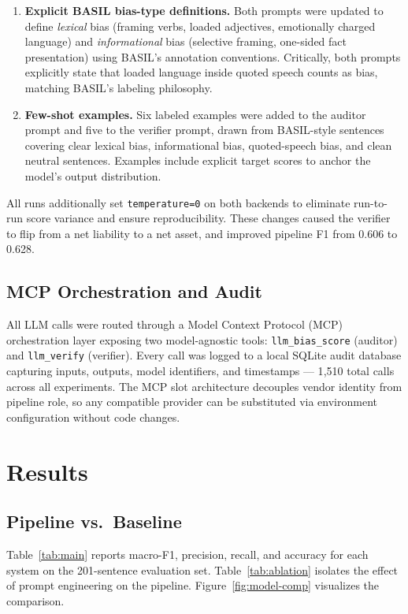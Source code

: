 \documentclass[11pt]{article}
\begin{document}
\begin{enumerate}
\itemsep2pt
\item \textbf{Explicit BASIL bias-type definitions.} Both prompts were updated to define \textit{lexical} bias (framing verbs, loaded adjectives, emotionally charged language) and \textit{informational} bias (selective framing, one-sided fact presentation) using BASIL's annotation conventions. Critically, both prompts explicitly state that loaded language inside quoted speech counts as bias, matching BASIL's labeling philosophy.
\item \textbf{Few-shot examples.} Six labeled examples were added to the auditor prompt and five to the verifier prompt, drawn from BASIL-style sentences covering clear lexical bias, informational bias, quoted-speech bias, and clean neutral sentences. Examples include explicit target scores to anchor the model's output distribution.
\end{enumerate}

All runs additionally set \texttt{temperature=0} on both backends to eliminate run-to-run score variance and ensure reproducibility. These changes caused the verifier to flip from a net liability to a net asset, and improved pipeline F1 from 0.606 to 0.628.

\subsection{MCP Orchestration and Audit}
All LLM calls were routed through a Model Context Protocol (MCP) orchestration layer exposing two model-agnostic tools: \texttt{llm\_bias\_score} (auditor) and \texttt{llm\_verify} (verifier). Every call was logged to a local SQLite audit database capturing inputs, outputs, model identifiers, and timestamps --- 1{,}510 total calls across all experiments. The MCP slot architecture decouples vendor identity from pipeline role, so any compatible provider can be substituted via environment configuration without code changes.

\section{Results}

\subsection{Pipeline vs.\ Baseline}
Table~\ref{tab:main} reports macro-F1, precision, recall, and accuracy for each system on the 201-sentence evaluation set. Table~\ref{tab:ablation} isolates the effect of prompt engineering on the pipeline. Figure~\ref{fig:model-comp} visualizes the comparison.
\end{document}

